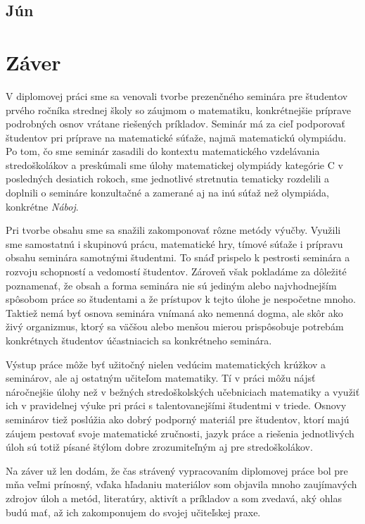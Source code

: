 \section{Jún}



\chapter*{Záver}
\label{chap:zaver}

V diplomovej práci sme sa venovali tvorbe prezenčného seminára pre študentov prvého ročníka strednej školy so záujmom o matematiku, konkrétnejšie príprave podrobných osnov vrátane riešených príkladov. Seminár má za cieľ podporovať študentov pri príprave na matematické súťaže, najmä matematickú olympiádu. Po tom, čo sme seminár zasadili do kontextu matematického vzdelávania stredoškolákov a preskúmali sme úlohy matematickej olympiády kategórie C v posledných desiatich rokoch, sme jednotlivé stretnutia tematicky rozdelili a doplnili o semináre konzultačné a zamerané aj na inú súťaž než olympiáda, konkrétne \textit{Náboj}.

Pri tvorbe obsahu sme sa snažili zakomponovať rôzne metódy výučby. Využili sme samostatnú i skupinovú prácu, matematické hry, tímové súťaže i prípravu obsahu seminára samotnými študentmi. To snáď prispelo k pestrosti seminára a rozvoju schopností a vedomostí študentov. Zároveň však pokladáme za dôležité poznamenať, že obsah a forma seminára nie sú jediným  alebo najvhodnejším spôsobom práce so študentami a že prístupov k tejto úlohe je nespočetne mnoho. Taktiež nemá byť osnova seminára vnímaná ako nemenná dogma, ale skôr ako živý organizmus, ktorý sa väčšou alebo menšou mierou prispôsobuje potrebám konkrétnych študentov účastniacich sa konkrétneho seminára.

Výstup práce môže byť užitočný nielen vedúcim matematických krúžkov a seminárov, ale aj ostatným učiteľom matematiky. Tí v práci môžu nájsť náročnejšie úlohy než v bežných stredoškolských učebniciach matematiky a využiť ich v pravidelnej výuke pri práci s talentovanejšími študentmi v triede. Osnovy seminárov tiež poslúžia ako dobrý podporný materiál pre študentov, ktorí majú záujem pestovať svoje matematické zručnosti, jazyk práce a riešenia jednotlivých úloh sú totiž písané štýlom dobre zrozumiteľným aj pre stredoškolákov.

Na záver už len dodám, že čas strávený vypracovaním diplomovej práce bol pre mňa veľmi prínosný, vďaka hľadaniu materiálov som objavila mnoho zaujímavých zdrojov úloh a metód, literatúry, aktivít a príkladov a som zvedavá, aký ohlas budú mať, až ich zakomponujem do svojej učiteľskej praxe.

